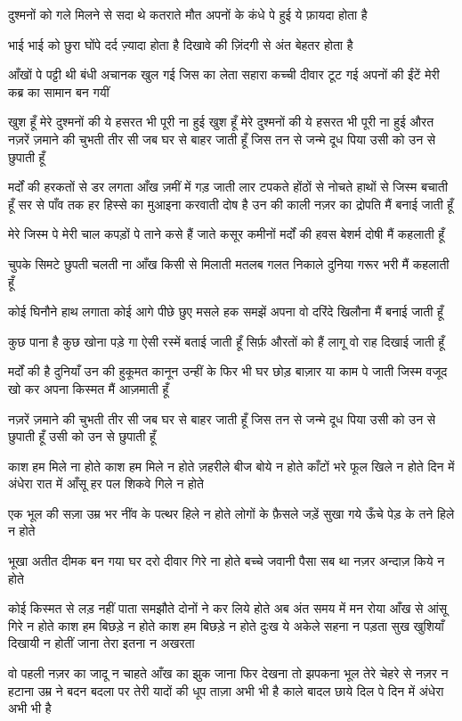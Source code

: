 दुश्मनों को गले मिलने से सदा थे कतराते
मौत अपनों के कंधे पे हुई ये फ़ायदा होता है

भाई भाई को छुरा घोंपे दर्द ज़्यादा होता है
दिखावे की ज़िंदगी से अंत बेहतर होता है

आँखों पे पट्टी थी बंधी अचानक खुल गई
जिस का लेता सहारा कच्ची दीवार टूट गई
अपनों की ईंटें मेरी कब्र का सामान बन गयीं

खुश हूँ मेरे दुश्मनों की ये हसरत भी पूरी ना
हुई
खुश हूँ मेरे दुश्मनों की ये हसरत भी पूरी ना
हुई
औरत
नज़रें ज़माने की चुभती तीर सी
जब घर से बाहर जाती हूँ
जिस तन से जन्मे दूध पिया
उसी को उन से छुपाती हूँ

मर्दों की हरकतों से डर लगता
आँख ज़मीं में गड़ जाती
लार टपकते होंठों से
नोचते हाथों से जिस्म बचाती हूँ
सर से पाँव तक हर
हिस्से का मुआइना करवाती
दोष है उन की काली नज़र का
द्रोपति मैं बनाई जाती हूँ

मेरे जिस्म पे मेरी चाल
कपड़ों पे ताने कसे हैं जाते
कसूर कमीनों मर्दों की हवस
बेशर्म दोषी मैं कहलाती हूँ


चुपके सिमटे छुपती चलती
ना आँख किसी से मिलाती
मतलब गलत निकाले दुनिया
गरूर भरी मैं कहलाती हूँ

कोई घिनौने हाथ लगाता
कोई आगे पीछे छुए मसले
हक समझें अपना वो दरिंदे
खिलौना मैं बनाई जाती हूँ


कुछ पाना है कुछ खोना पड़े गा
ऐसी रस्में बताई जाती हूँ 
सिर्फ़ औरतों को हैं लागू
वो राह दिखाई जाती हूँ

मर्दों की है दुनियाँ
उन की हुकूमत कानून उन्हीं के
फिर भी घर छोड़
बाज़ार या काम पे जाती
जिस्म वजूद खो कर अपना
किस्मत मैं आज़माती हूँ

नज़रें ज़माने की चुभती तीर सी
जब घर से बाहर जाती हूँ
जिस तन से जन्मे दूध पिया
उसी को उन से छुपाती हूँ
उसी को उन से छुपाती हूँ

काश हम मिले ना होते
काश हम मिले न होते
ज़हरीले बीज बोये न होते
काँटों भरे फूल खिले न होते
दिन में अंधेरा रात में आँसू
हर पल शिकवे गिले न होते

एक भूल की सज़ा उम्र भर
नींव के पत्थर हिले न होते
लोगों के फ़ैसले जड़ें सुखा गये
ऊँचे पेड़ के तने हिले न होते

भूखा अतीत दीमक बन गया
घर दरो दीवार गिरे ना होते
बच्चे जवानी पैसा सब था
नज़र अन्दाज़ किये न होते

कोई किस्मत से लड़ नहीं पाता
समझौते दोनों ने कर लिये होते
अब अंत समय में मन रोया
आँख से आंसू गिरे न होते
काश हम बिछड़े न होते
काश हम बिछड़े न होते
दुःख ये अकेले सहना न पड़ता
सुख खुशियाँ दिखायी न होतीं
जाना तेरा इतना न अखरता

वो पहली नज़र का जादू
न चाहते आँख का झुक जाना
फिर देखना तो झपकना भूल
तेरे चेहरे से नज़र न हटाना
उम्र ने बदन बदला पर तेरी
यादों की धूप ताज़ा अभी भी है
काले बादल छाये दिल पे
दिन में अंधेरा अभी भी है

